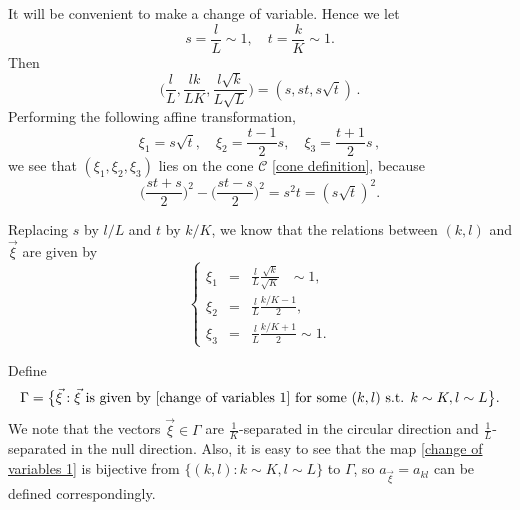 \documentclass[11pt]{amsart}
\numberwithin{equation}{section}
\theoremstyle{definition}
\theoremstyle{proposition}
\begin{document}
\quad

It will be convenient to make a change of variable. Hence we let 
\[
s=\frac{l}{L}\sim 1, \quad t=\frac{k}{K}\sim 1.
\]
Then 
\[\Big(\frac{l}{L},\frac{lk}{LK},\frac{l\sqrt{k}}{L\sqrt{L}}\Big)=(s,st,s\sqrt{t})\,.\]
Performing the following affine transformation, 
\begin{equation}\label{trans}
\xi_1=s\sqrt{t}, \quad \xi_2=\frac{t-1}{2}s,\quad \xi_3=\frac{t+1}{2}s\,,
\end{equation}
we see that  $(\xi_1, \xi_2, \xi_3)$ lies on the cone $\mathcal{C}$ \eqref{cone definition}, because 
\begin{equation}   \label{reason for lying on the cone}
\Big(\frac{st+s}{2}\Big)^2 -\Big(\frac{st-s}{2}\Big)^2=s^2 t=(s\sqrt{t})^2.    
\end{equation}

Replacing $s$ by $l/L$ and $t$ by $k/K$,  we know that the relations between $(k,l)$ and $\Vec{\xi}$ are given by 
\begin{equation}  \label{change of variables 1}
\left\{\begin{array}{rcl}
\xi_1 &= & \frac{l}{L}\frac{\sqrt{k}}{\sqrt{K}} \,\,\,\, \sim 1,
\\ \xi_2 &= &\frac{l}{L} \frac{k/K-1}{2}, 
\\ \xi_3 &= & \frac{l}{L} \frac{k/K+1}{2}  \sim 1.
\end{array}\right.    
\end{equation}

Define
\[
\Gamma=\big\{\Vec{\xi}: \Vec{\xi} \text{ is given by } \eqref{change of variables 1} \text{ for some }(k,l) \text{ s.t. }k\sim K, l\sim L \big\}.
\]
We note that the vectors $\Vec{\xi}\in \Gamma$ are $\frac{1}{K}$-separated in the circular direction and $\frac{1}{L}$-separated in the null direction. Also, it is easy to see that the map \eqref{change of variables 1} is bijective from $\{(k,l):k\sim K, l\sim L\}$ to $\Gamma$, so $a_{\Vec{\xi}}=a_{kl}$ can be defined correspondingly.\\
\end{document}
